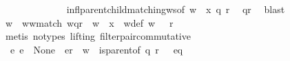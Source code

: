 \begin{isabellebody}
\ \ \ \ \ \ \ \ \ \ \ \ \isamarkupfalse%
\ infl{\isacharunderscore}{\kern0pt}parent{\isacharunderscore}{\kern0pt}child{\isacharunderscore}{\kern0pt}matching{\isacharunderscore}{\kern0pt}ws{\isacharbrackleft}{\kern0pt}of\ {\isachardoublequoteopen}{\isacharparenleft}{\kern0pt}w{\isacharprime}{\kern0pt}\ {\isasymsqdot}\ x{\isacharprime}{\kern0pt}{\isacharparenright}{\kern0pt}{\isachardoublequoteclose}\ q\ r{\isacharbrackright}{\kern0pt}\ \isamarkupfalse%
\ qr\ \isamarkupfalse%
\ blast\isanewline
\ \ \ \ \ \ \ \ \ \ \isamarkupfalse%
\ \isamarkupfalse%
\ w{\isacharprime}{\kern0pt}{\isacharprime}{\kern0pt}\ \ w{\isacharprime}{\kern0pt}{\isacharprime}{\kern0pt}{\isacharunderscore}{\kern0pt}w{\isacharprime}{\kern0pt}{\isacharunderscore}{\kern0pt}match{\isacharcolon}{\kern0pt}\ {\isachardoublequoteopen}w{\isacharprime}{\kern0pt}{\isacharprime}{\kern0pt}{\isasymdown}\isactrlsub {\isacharbang}{\kern0pt}{\isasymdown}\isactrlsub {\isacharbraceleft}{\kern0pt}\isactrlsub q\isactrlsub {\isacharcomma}{\kern0pt}\isactrlsub r\isactrlsub {\isacharbraceright}{\kern0pt}{\isasymdown}\isactrlsub {\isacharbang}{\kern0pt}\isactrlsub {\isacharquery}{\kern0pt}\ {\isacharequal}{\kern0pt}\ {\isacharparenleft}{\kern0pt}w{\isacharprime}{\kern0pt}\ {\isasymsqdot}\ x{\isacharprime}{\kern0pt}{\isacharparenright}{\kern0pt}{\isasymdown}\isactrlsub {\isacharquery}{\kern0pt}{\isasymdown}\isactrlsub {\isacharbang}{\kern0pt}\isactrlsub {\isacharquery}{\kern0pt}{\isachardoublequoteclose}\ \ w{\isacharprime}{\kern0pt}{\isacharprime}{\kern0pt}{\isacharunderscore}{\kern0pt}def{\isacharcolon}{\kern0pt}\ {\isachardoublequoteopen}w{\isacharprime}{\kern0pt}{\isacharprime}{\kern0pt}\ {\isasymin}\ {\isasymL}\isactrlsup {\isacharasterisk}{\kern0pt}\ r{\isachardoublequoteclose}\ \isamarkupfalse%
\ {\isacharparenleft}{\kern0pt}metis\ {\isacharparenleft}{\kern0pt}no{\isacharunderscore}{\kern0pt}types{\isacharcomma}{\kern0pt}\ lifting{\isacharparenright}{\kern0pt}\ filter{\isacharunderscore}{\kern0pt}pair{\isacharunderscore}{\kern0pt}commutative{\isacharparenright}{\kern0pt}\isanewline
\ \ \ \ \ \ \ \ \ \ \ \ \ \ \isanewline
\ \ \ \ \ \ \ \ \ \ \isamarkupfalse%
\ {\isachardoublequoteopen}{\isasymexists}\ e{\isachardot}{\kern0pt}\ {\isacharparenleft}{\kern0pt}e\ {\isasymin}\ {\isasymT}\isactrlbsub None\isactrlesub \ {\isasymand}\ e{\isasymdown}\isactrlsub r\ {\isacharequal}{\kern0pt}\ w{\isacharprime}{\kern0pt}{\isacharprime}{\kern0pt}\ {\isasymand}\ {\isacharparenleft}{\kern0pt}{\isacharparenleft}{\kern0pt}is{\isacharunderscore}{\kern0pt}parent{\isacharunderscore}{\kern0pt}of\ q\ r{\isacharparenright}{\kern0pt}\ {\isasymlongrightarrow}\ \ e{\isasymdown}\isactrlsub q\ {\isacharequal}{\kern0pt}\ {\isasymepsilon}{\isacharparenright}{\kern0pt}{\isacharparenright}{\kern0pt}{\isachardoublequoteclose}\ \ \isamarkupfalse%

\end{isabellebody}
